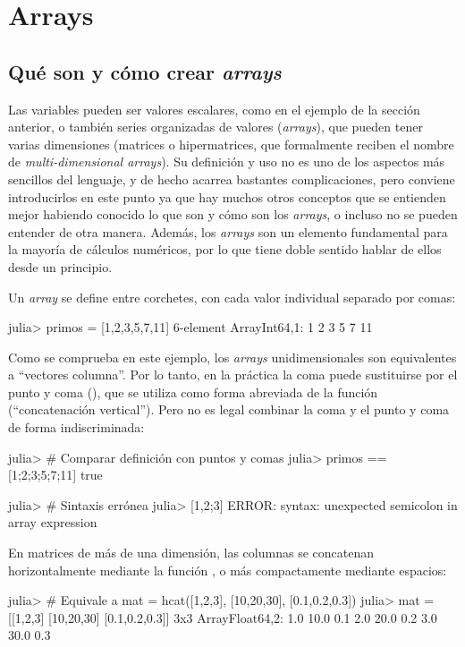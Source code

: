 \chapter{Arrays}

\section{Qué son y cómo crear \emph{arrays}}
Las variables pueden ser valores escalares, como en el ejemplo de la sección anterior, o también series organizadas de valores (\emph{arrays}), que pueden tener varias dimensiones (matrices o hipermatrices, que formalmente reciben el nombre de \emph{multi-dimensional arrays}). Su definición y uso no es uno de los aspectos más sencillos del lenguaje, y de hecho acarrea bastantes complicaciones, pero conviene introducirlos en este punto ya que hay muchos otros conceptos que se entienden mejor habiendo conocido lo que son y cómo son los \emph{arrays}, o incluso no se pueden entender de otra manera. Además, los \emph{arrays} son un elemento fundamental para la mayoría de cálculos numéricos, por lo que tiene doble sentido hablar de ellos desde un principio.

Un \emph{array} se define entre corchetes, con cada valor individual separado por comas:

\begin{jlconcode}
julia> primos = [1,2,3,5,7,11]
6-element Array{Int64,1}:
 1
 2
 3
 5
 7
 11
\end{jlconcode}

Como se comprueba en este ejemplo, los \emph{arrays} unidimensionales son equivalentes a ``vectores columna''. Por lo tanto, en la práctica la coma puede sustituirse por el punto y coma (\code{;}), que se utiliza como forma abreviada de la función  (``concatenación vertical''). Pero no es legal combinar la coma y el punto y coma de forma indiscriminada:

\begin{jlconcode}
julia> # Comparar definición con puntos y comas
julia> primos == [1;2;3;5;7;11]
true

julia> # Sintaxis errónea
julia> [1,2;3]
ERROR: syntax: unexpected semicolon in array expression
\end{jlconcode}

En matrices de más de una dimensión, las columnas se concatenan horizontalmente mediante la función , o más compactamente mediante espacios:

\begin{jlconcode}
julia> # Equivale a mat = hcat([1,2,3], [10,20,30], [0.1,0.2,0.3])
julia> mat = [[1,2,3] [10,20,30] [0.1,0.2,0.3]]
3x3 Array{Float64,2}:
 1.0 10.0 0.1
 2.0 20.0 0.2
 3.0 30.0 0.3
\end{jlconcode}

